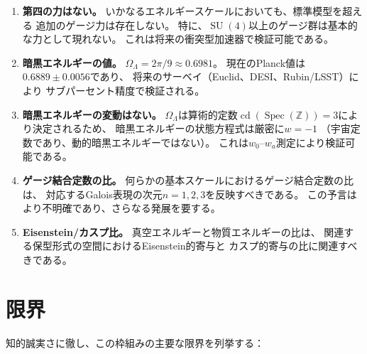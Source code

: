 \documentclass[12pt,a4paper]{article}
\theoremstyle{definition}
\newcommand{\Spec}{\operatorname{Spec}}
\newcommand{\SU}{\operatorname{SU}}
\newcommand{\cd}{\operatorname{cd}}
\newcommand{\Z}{\mathbb{Z}}
\newcommand{\OmL}{\Omega_\Lambda}
\begin{document}
\begin{enumerate}
  \item \textbf{第四の力はない。}
    いかなるエネルギースケールにおいても、標準模型を超える
    追加のゲージ力は存在しない。
    特に、$\SU(4)$以上のゲージ群は基本的な力として現れない。
    これは将来の衝突型加速器で検証可能である。

  \item \textbf{暗黒エネルギーの値。}
    $\OmL = 2\pi/9 \approx 0.6981$。
    現在のPlanck値は$0.6889\pm0.0056$であり、
    将来のサーベイ（Euclid、DESI、Rubin/LSST）により
    サブパーセント精度で検証される。

  \item \textbf{暗黒エネルギーの変動はない。}
    $\OmL$は算術的定数$\cd(\Spec(\Z))=3$により決定されるため、
    暗黒エネルギーの状態方程式は厳密に$w=-1$
    （宇宙定数であり、動的暗黒エネルギーではない）。
    これは$w_0$--$w_a$測定により検証可能である。

  \item \textbf{ゲージ結合定数の比。}
    何らかの基本スケールにおけるゲージ結合定数の比は、
    対応するGalois表現の次元$n=1,2,3$を反映すべきである。
    この予言はより不明確であり、さらなる発展を要する。

  \item \textbf{Eisenstein/カスプ比。}
    真空エネルギーと物質エネルギーの比は、
    関連する保型形式の空間におけるEisenstein的寄与と
    カスプ的寄与の比に関連すべきである。
\end{enumerate}

\section{限界}\label{sec:limitations}

知的誠実さに徹し、この枠組みの主要な限界を列挙する：
\end{document}
